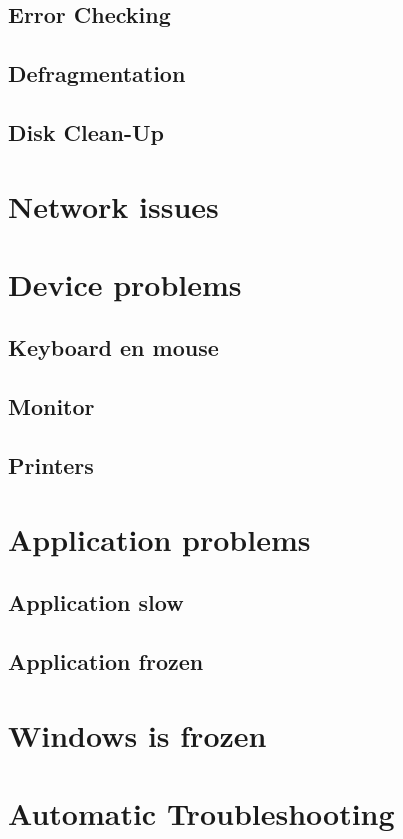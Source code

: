 \documentclass[a4paper,12pt,twoside,titlepage]{article}
\begin{document}
\subsection{Error Checking}

\subsection{Defragmentation}

\subsection{Disk Clean-Up}


\section{Network issues}

\section{Device problems}
\subsection{Keyboard en mouse}
\subsection{Monitor}
\subsection{Printers}

\section{Application problems}
\subsection{Application slow}
\subsection{Application frozen}

\section{Windows is frozen}

\section{Automatic Troubleshooting}



\printindex
\end{document}
